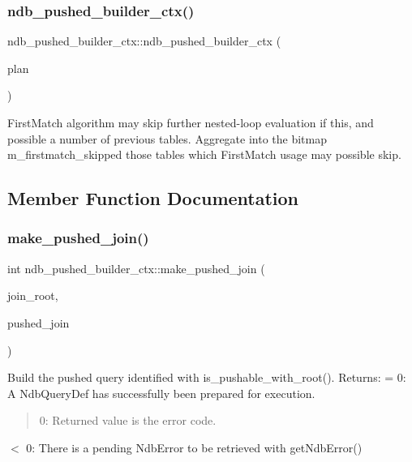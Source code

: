 \subsubsection{\texorpdfstring{ndb\+\_\+pushed\+\_\+builder\+\_\+ctx()}{ndb\_pushed\_builder\_ctx()}}
{\footnotesize\ttfamily ndb\+\_\+pushed\+\_\+builder\+\_\+ctx\+::ndb\+\_\+pushed\+\_\+builder\+\_\+ctx (\begin{DoxyParamCaption}\item[{const \mbox{\hyperlink{classAQP_1_1Join__plan}{A\+Q\+P\+::\+Join\+\_\+plan}} \&}]{plan }\end{DoxyParamCaption})}

First\+Match algorithm may skip further nested-\/loop evaluation if this, and possible a number of previous tables. Aggregate into the bitmap \textquotesingle{}m\+\_\+firstmatch\+\_\+skipped\textquotesingle{} those tables which \textquotesingle{}First\+Match\textquotesingle{} usage may possible skip.

\subsection{Member Function Documentation}
\mbox{\label{classndb__pushed__builder__ctx_a9472b36f6733ba8df3f8fd2563025cb1}} 
\subsubsection{\texorpdfstring{make\+\_\+pushed\+\_\+join()}{make\_pushed\_join()}}
{\footnotesize\ttfamily int ndb\+\_\+pushed\+\_\+builder\+\_\+ctx\+::make\+\_\+pushed\+\_\+join (\begin{DoxyParamCaption}\item[{const \mbox{\hyperlink{classAQP_1_1Table__access}{A\+Q\+P\+::\+Table\+\_\+access}} $\ast$}]{join\+\_\+root,  }\item[{const \mbox{\hyperlink{classndb__pushed__join}{ndb\+\_\+pushed\+\_\+join}} $\ast$\&}]{pushed\+\_\+join }\end{DoxyParamCaption})}

Build the pushed query identified with \textquotesingle{}is\+\_\+pushable\+\_\+with\+\_\+root()\textquotesingle{}. Returns\+: = 0\+: A Ndb\+Query\+Def has successfully been prepared for execution. \begin{quote}
0\+: Returned value is the error code. \end{quote}
$<$ 0\+: There is a pending Ndb\+Error to be retrieved with get\+Ndb\+Error()


